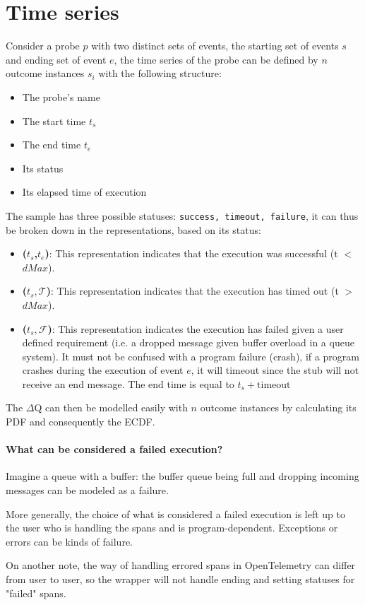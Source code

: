\section{Time series}
    Consider a probe $p$ with two distinct sets of events, the starting set of events $s$ and ending set of event $e$, the time series of the probe can be defined by $n$ outcome instances $s_i$ with the following structure:
    \begin{itemize}
        \item The probe's name
        \item The start time $t_s$
        \item The end time $t_e$
        \item Its status 
        \item Its elapsed time of execution
    \end{itemize}
    The sample has three possible statuses: \texttt{success, timeout, failure}, it can thus be broken down in the representations, based on its status:
    \begin{itemize}
        \item \textbf{($t_s$,$t_e$)}: This representation indicates that the execution was successful (t $<$ $dMax$). 
        \item \textbf{($t_s, \mathcal{T}$)}: This representation indicates that the execution has timed out (t $>$ $dMax$). 
        \item \textbf{($t_s, \mathcal{F}$)}: This representation indicates the execution has failed given a user defined requirement (i.e. a dropped message given buffer overload in a queue system). It must not be confused with a program failure (crash), if a program crashes during the execution of event $e$, it will timeout since the stub will not receive an end message. The end time is equal to $t_s + \text{timeout}$ 
    \end{itemize}
    The $\Delta$Q can then be modelled easily with $n$ outcome instances by calculating its PDF and consequently the ECDF.

    \paragraph{What can be considered a failed execution?} Imagine a queue with a buffer: the buffer queue being full and dropping incoming messages can be modeled as a failure.

    More generally, the choice of what is considered a failed execution is left up to the user who is handling the spans and is program-dependent. Exceptions or errors can be kinds of failure. 

    On another note, the way of handling errored spans in OpenTelemetry can differ from user to user, so the wrapper will not handle ending and setting statuses for "failed" spans.
   
